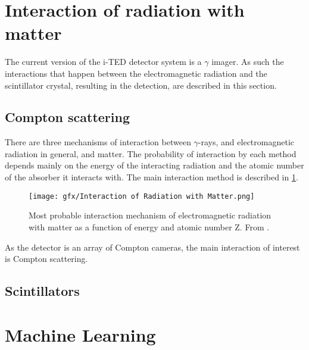 \section{Interaction of radiation with matter}\label{sec:interaction}

The current version of the \ac{i-TED} detector system is a $\gamma$ imager. As such the interactions that happen between the electromagnetic radiation and the scintillator crystal, resulting in the detection, are described in this section.

\subsection{Compton scattering}

There are three mechanisms of interaction between $\gamma$-rays, and electromagnetic radiation in general, and matter. The probability of interaction by each method depends mainly on the energy of the interacting radiation and the atomic number of the absorber it interacts with. The main interaction method is described in \ref{fig:interaction_mechanism}.

\begin{figure}[h!]
    \centering
    \texttt{[image: gfx/Interaction of Radiation with Matter.png]}%
    \caption{Most probable interaction mechanism of electromagnetic radiation with matter as a function of energy and atomic number Z. From \cite[p.~7]{ParticlePhysicsReference2}.}%
    \label{fig:interaction_mechanism}%
\end{figure}

As the detector is an array of Compton cameras, the main interaction of interest is Compton scattering.

\subsection{Scintillators}

\section{Machine Learning}\label{sec:ml}

